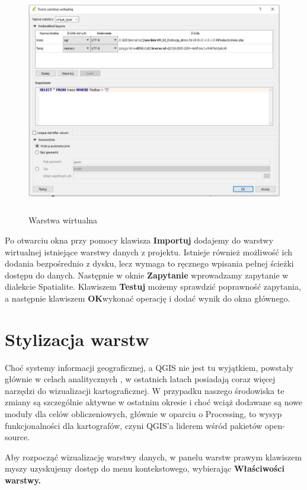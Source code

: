 \documentclass[12pt,a4paper]{book}
\begin{document}
\begin{center}
\begin{figure}
\includegraphics[width=13cm,height=9.917cm]{006-virtual.jpg}
\caption{Warstwa wirtualna}
\end{figure}
\end{center}
Po otwarciu okna przy pomocy klawisza \textbf{Importuj }dodajemy do warstwy wirtualnej istniejące warstwy danych z projektu. Istnieje również możliwość ich dodania bezpośrednio z dysku, lecz wymaga to ręcznego wpisania pełnej ścieżki dostępu do danych. Następnie w oknie \textbf{Zapytanie }wprowadzamy zapytanie w dialekcie Spatialite. Klawiszem\textbf{ Testuj }możemy sprawdzić poprawność zapytania, a następnie klawiszem \textbf{OK}wykonać operację i dodać wynik do okna głównego.

\chapter{Stylizacja warstw}
Choć systemy informacji geograficznej, a QGIS nie jest tu wyjątkiem, powstały głównie w celach analitycznych \cite{kraak2011cartography}, w ostatnich latach posiadają coraz więcej narzędzi do wizualizacji kartograficznej. W przypadku naszego środowiska te zmiany są szczególnie aktywne w ostatnim okresie i choć wciąż dodawane są nowe moduły dla celów obliczeniowych, głównie w oparciu o Processing, to wysyp funkcjonalności dla kartografów, czyni QGIS'a liderem wśród pakietów open-source.

Aby rozpocząć wizualizację warstwy danych, w panelu warstw prawym klawiszem myszy uzyskujemy dostęp do menu kontekstowego, wybierając \textbf{Właściwości warstwy.}
\end{document}
